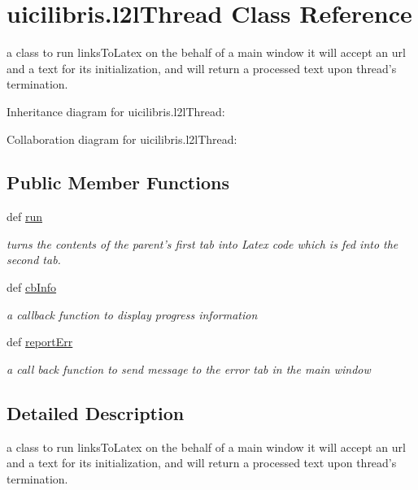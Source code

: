 \hypertarget{classuicilibris_1_1l2lThread}{\section{uicilibris.\-l2l\-Thread \-Class \-Reference}
\label{classuicilibris_1_1l2lThread}
}


a class to run links\-To\-Latex on the behalf of a main window it will accept an url and a text for its initialization, and will return a processed text upon thread's termination.  




\-Inheritance diagram for uicilibris.\-l2l\-Thread\-:


\-Collaboration diagram for uicilibris.\-l2l\-Thread\-:
\subsection*{\-Public \-Member \-Functions}
\begin{DoxyCompactItemize}
\item 
def \hyperlink{classuicilibris_1_1l2lThread_a53c112a8443b3513c09e38612e867079}{run}
\begin{DoxyCompactList}\small\item\em turns the contents of the parent's first tab into \-Latex code which is fed into the second tab. \end{DoxyCompactList}\item 
def \hyperlink{classuicilibris_1_1l2lThread_a28397d7c4810cb174522c80b5598f14f}{cb\-Info}
\begin{DoxyCompactList}\small\item\em a callback function to display progress information \end{DoxyCompactList}\item 
def \hyperlink{classuicilibris_1_1l2lThread_a4518679cb4b77fc594a17e1754b2c27f}{report\-Err}
\begin{DoxyCompactList}\small\item\em a call back function to send message to the error tab in the main window \end{DoxyCompactList}\end{DoxyCompactItemize}


\subsection{\-Detailed \-Description}
a class to run links\-To\-Latex on the behalf of a main window it will accept an url and a text for its initialization, and will return a processed text upon thread's termination. 

